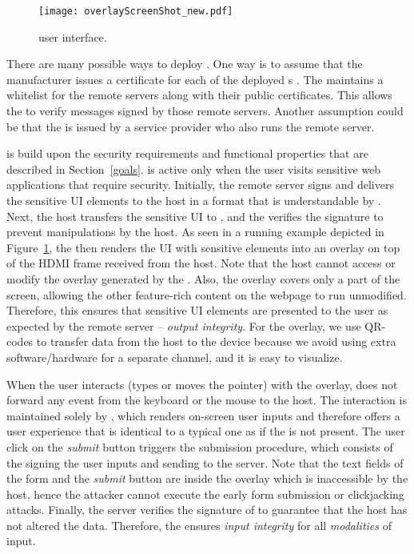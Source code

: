 \begin{figure}[t]
	\centering
	\texttt{[image: overlayScreenShot\_new.pdf]}
	\caption{\protection user interface.}
	\label{fig:screenshot_1}
\end{figure}

There are many possible ways to deploy \protection. One way is to assume that the \protection manufacturer issues a certificate for each of the deployed \protection{}s . The \protection maintains a whitelist for the remote servers along with their public certificates. This allows the \protection to verify messages signed by those remote servers. Another assumption could be that the \protection is issued by a service provider who also runs the remote server. 

\protection is build upon the security requirements and functional properties that are described in Section~\ref{goals}. 
\protection is active only when the user visits sensitive web applications that require \name security.
Initially, the remote server signs and delivers the sensitive UI elements to the host in a format that is understandable by \protection. Next, the host transfers the sensitive UI to \protection, and the \protection verifies the signature to prevent manipulations by the host. As seen in a running example depicted in Figure~\ref{fig:screenshot_1}, the \protection then renders the UI with sensitive elements into an overlay on top of the HDMI frame received from the host. Note that the host cannot access or modify the overlay generated by the \protection. Also, the overlay covers only a part of the screen, allowing the other feature-rich content on the webpage to run unmodified. Therefore, this ensures that sensitive UI elements are presented to the user as expected by the remote server -- \emph{output integrity}. For the overlay, we use QR-codes to transfer data from the host to the device because we avoid using extra software/hardware for a separate channel, and it is easy to visualize.

When the user interacts (types or moves the pointer) with the overlay, \protection does not forward any event from the keyboard or the mouse to the host. The interaction is maintained solely by \protection, which renders on-screen user inputs and therefore offers a user experience that is identical to a typical one as if the \protection is not present. The user click on the \emph{submit} button triggers the submission procedure, which consists of the \protection signing the user inputs and sending to the server. Note that the text fields of the form and the \emph{submit} button are inside the overlay which is inaccessible by the host, hence the attacker cannot execute the early form submission or clickjacking attacks. Finally, the server verifies the signature of \protection to guarantee that the host has not altered the data. Therefore, the \protection ensures \emph{input integrity} for all \emph{modalities} of input.

